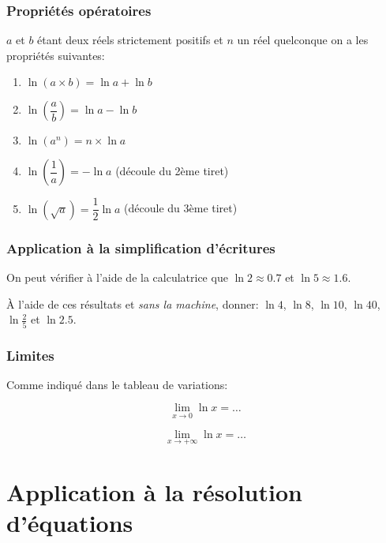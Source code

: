 \documentclass[a4paper,12pt]{scrartcl}
\begin{document}
\subsubsection{Propriétés opératoires}

$a$ et $b$ étant deux réels strictement positifs et $n$ un réel quelconque on a les propriétés suivantes:

\begin{enumerate}
 \item $\ln (a \times b) = \ln a + \ln b$
 \item $\ln \left(\dfrac{a}{b} \right) = \ln a - \ln b$
 \item $\ln (a^n) = n \times \ln a$	
 \item $\ln \left(\dfrac{1}{a} \right) = - \ln a$ (découle du 2ème tiret)
 \item $\ln \left( \sqrt{a} \right) = \dfrac{1}{2} \ln a$ (découle du 3ème tiret)
\end{enumerate}

\subsubsection{Application à la simplification d'écritures}

On peut vérifier à l'aide de la calculatrice que $\ln 2 \approx 0.7$ et $\ln 5 \approx 1.6$.

À l'aide de ces résultats et \emph{sans la machine}, donner: $\ln 4$, $\ln 8$, $\ln 10$, $\ln 40$, $\ln \frac{2}{5}$ et $\ln 2.5$.


\subsubsection{Limites}

Comme indiqué dans le tableau de variations:

\begin{equation*}
 \lim_{x \rightarrow 0} \ln x = \ldots
\end{equation*}

\begin{equation*}
 \lim_{x \rightarrow +\infty} \ln x = \ldots
\end{equation*}

\section{Application à la résolution d'équations}
\end{document}
